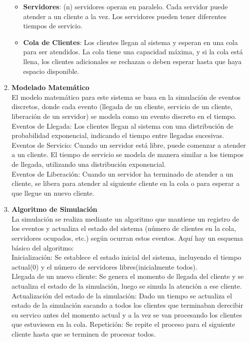 \documentclass[article]{amsart}
\begin{document}
\begin{enumerate}
\begin{itemize}
\item    \textbf{Servidores}: (n) servidores operan en paralelo. Cada servidor puede atender a un cliente a la vez. Los servidores pueden tener diferentes tiempos de servicio.\\
\item    \textbf{Cola de Clientes}: Los clientes llegan al sistema y esperan en una cola para ser atendidos. La cola tiene una capacidad máxima, y si la cola está llena, los clientes adicionales se rechazan o deben esperar hasta que haya espacio disponible.\\

\end{itemize}
\item \textbf{Modelado Matemático}\\

El modelo matemático para este sistema se basa en la simulación de eventos discretos, donde cada evento (llegada de un cliente, servicio de un cliente, liberación de un servidor) se modela como un evento discreto en el tiempo.\\

    Eventos de Llegada: Los clientes llegan al sistema con una distribución de probabilidad exponencial, indicando el tiempo entre llegadas sucesivas.\\
    Eventos de Servicio: Cuando un servidor está libre, puede comenzar a atender a un cliente. El tiempo de servicio se modela de manera similar a los tiempos de llegada, utilizando una distribución exponencial.\\
    Eventos de Liberación: Cuando un servidor ha terminado de atender a un cliente, se libera para atender al siguiente cliente en la cola o para esperar a que llegue un nuevo cliente.\\

\item \textbf{Algoritmo de Simulación}\\

La simulación se realiza mediante un algoritmo que mantiene un registro de los eventos y actualiza el estado del sistema (número de clientes en la cola, servidores ocupados, etc.) según ocurran estos eventos. Aquí hay un esquema básico del algoritmo:\\

    Inicialización: Se establece el estado inicial del sistema, incluyendo el tiempo actual(0) y el número de servidores libres(inicialmente todos).\\
    Llegada de un nuevo cliente: Se genera el momento de llegada del cliente y se actualiza el estado de la simulaci\'on, luego se simula la atenci\'on a ese cliente.
    Actualizaci\'on del estado de la simulaci\'on: Dado un tiempo se actualiza el estado de la simulaci\'on sacando a todos los clientes que terminaban derecibir su servico antes del momento actual  y a la vez se van procesando los clientes que estuviesen en la cola.
    Repetición: Se repite el proceso para el siguiente cliente hasta que se terminen de procesar todos.\\


\end{enumerate}
\end{document}
